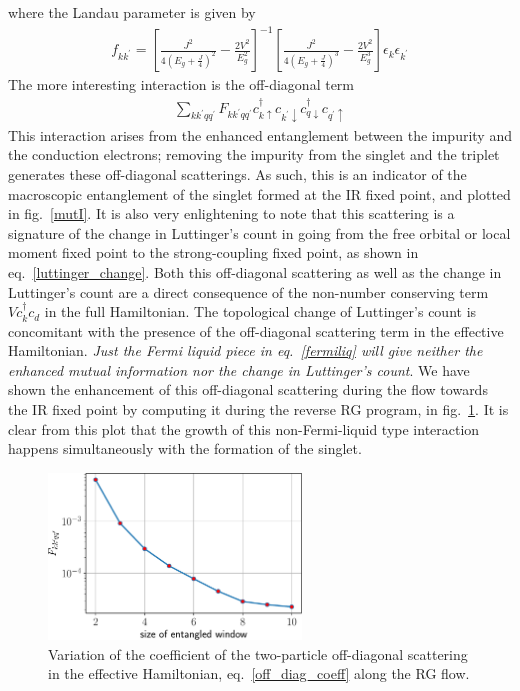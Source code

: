 \documentclass[12pt,twoside]{report}
\numberwithin{equation}{section}
\begin{document}
where the Landau parameter is given by
\begin{equation}\begin{aligned}
	\label{fermiliq}
	f_{kk^\prime} = \left[\frac{J^2}{4\left( E_g + \frac{J}{4} \right)^2} - \frac{2V^2}{E_g^2}\right]^{-1}\left[\frac{J^2}{4\left( E_g + \frac{J}{4} \right) ^3} - \frac{2V^2}{E_g^3}\right]\epsilon_k \epsilon_{k^\prime}
\end{aligned}\end{equation}
The more interesting interaction is the off-diagonal term
\begin{equation}\begin{aligned}
	 \sum_{kk^\prime q q^\prime} F_{kk^\prime qq^\prime}c^\dagger_{k \uparrow}c_{k^\prime \downarrow}c^\dagger_{q \downarrow}c_{q^\prime \uparrow}
\end{aligned}\end{equation}
This interaction arises from the enhanced entanglement between the impurity and the conduction electrons; removing the impurity from the singlet and the triplet generates these off-diagonal scatterings. As such, this is an indicator of the macroscopic entanglement of the singlet formed at the IR fixed point, and plotted in fig.~\ref{mutI}. 
\pb It is also very enlightening to note that this scattering is a signature of the change in Luttinger's count in going from the free orbital or local moment fixed point to the strong-coupling fixed point, as shown in eq.~\ref{luttinger_change}. Both this off-diagonal scattering as well as the change in Luttinger's count are a direct consequence of the non-number conserving term \(V c^\dagger_{k} c_d\) in the full Hamiltonian. The topological change of Luttinger's count is concomitant with the presence of the off-diagonal scattering term in the effective Hamiltonian. \textit{Just the Fermi liquid piece in eq.~\ref{fermiliq} will give neither the enhanced mutual information nor the change in Luttinger's count}.
\pb We have shown the enhancement of this off-diagonal scattering during the flow towards the IR fixed point by computing it during the reverse RG program, in fig.~\ref{Fkkqq}. It is clear from this plot that the growth of this non-Fermi-liquid type interaction happens simultaneously with the formation of the singlet.
\begin{figure}[htpb]
	\centering
	\includegraphics[width=0.6\textwidth]{../figures/Fkkqq.pdf}
	\caption{Variation of the coefficient of the two-particle off-diagonal scattering in the effective Hamiltonian, eq.~\ref{off_diag_coeff} along the RG flow.}
	\label{Fkkqq}
\end{figure}
\end{document}
